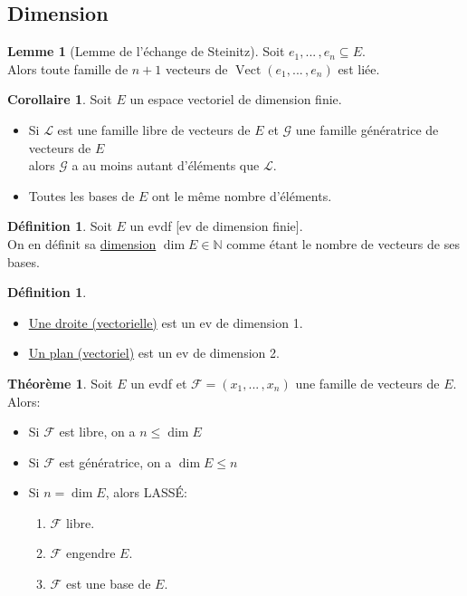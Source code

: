 \documentclass[10pt,a4paper]{article}
\theoremstyle{definition}
\newtheorem{theorem}[proposition]{Théorème}
\newtheorem{corollaire}[proposition]{Corollaire}
\newtheorem{lemme}[proposition]{Lemme}
\newtheorem{definition}[proposition]{Définition}
\DeclareMathOperator{\vect}{Vect}
\begin{document}
\subsection{Dimension}
\begin{lemme}[Lemme de l'échange de Steinitz]
Soit $e_1, ...\, , e_n \subseteq E$. \\
Alors toute famille de $n + 1$ vecteurs de $\vect (e_1, ...\, , e_n)$ est liée.
\end{lemme}
\begin{corollaire}
Soit $E$ un espace vectoriel de dimension finie.
\begin{itemize}
\item Si $\mathcal{L}$ est une famille libre de vecteurs de $E$ et $\mathcal{G}$ une famille génératrice de vecteurs de $E$ \\
alors $\mathcal{G}$ a au moins autant d'éléments que $\mathcal{L}$.
\item Toutes les bases de $E$ ont le même nombre d'éléments.
\end{itemize}
\end{corollaire}
\begin{definition}
Soit $E$ un evdf [ev de dimension finie]. \\
On en définit sa \uline{dimension} $\dim E \in \mathbb{N}$ comme étant le nombre de vecteurs de ses bases.
\end{definition}

\pagebreak

\begin{definition}
\hfill
\begin{itemize}
\item \uline{Une droite (vectorielle)} est un ev de dimension 1.
\item \uline{Un plan (vectoriel)} est un ev de dimension 2.
\end{itemize}
\end{definition}
\begin{theorem}
Soit $E$ un evdf et $\mathcal{F} = (x_1, ...\, , x_n)$ une famille de vecteurs de $E$. \\
Alors:
\begin{itemize}
\item Si $\mathcal{F}$ est libre, on a $n \leq \dim E$
\item Si $\mathcal{F}$ est génératrice, on a $\dim E \leq n$
\item Si $n = \dim E$, alors LASSÉ:
\begin{enumerate}
\item $\mathcal{F}$ libre.
\item $\mathcal{F}$ engendre $E$.
\item $\mathcal{F}$ est une base de $E$. 
\end{enumerate}
\end{itemize}
\end{theorem}
\end{document}
